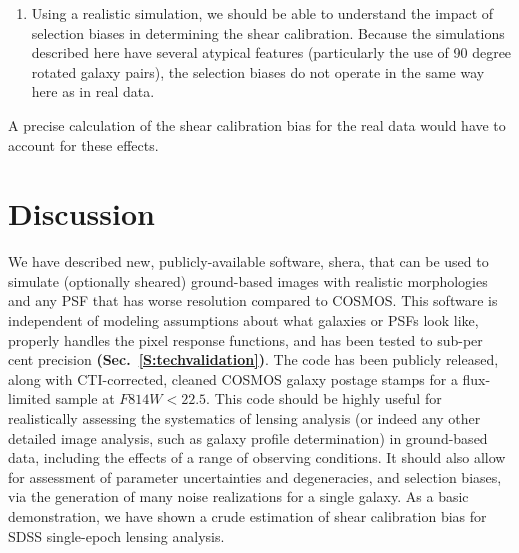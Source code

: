 \documentclass[twocolumn,useAMS,usenatbib]{mn2e}
\newcommand{\newtext}{}
\newcommand{\reftext}[1]{\textbf{#1}}
\begin{document}
\begin{enumerate}
\item Using a realistic simulation, we should be able to understand
  the impact of selection biases in determining the shear
  calibration. \newtext{Because the simulations described here have
    several atypical features (particularly the use of 90 degree
    rotated galaxy pairs), the selection biases do not operate in the
    same way here as in real data.}
\end{enumerate}

A precise calculation of the shear calibration bias for the real
data would have to account for these effects.

%
%
%

\section{Discussion}\label{S:discussion}

We have described new, publicly-available software, {\sc shera}, that can be used to
simulate (optionally sheared) ground-based images with realistic
morphologies and any PSF that has worse resolution compared to COSMOS.
This software is independent of modeling assumptions about what galaxies
or PSFs look like, properly handles the pixel response functions, and
has been tested to sub-per cent precision \reftext{(Sec.~\ref{S:techvalidation})}.  The code has been publicly
released, along with CTI-corrected, cleaned COSMOS galaxy postage
stamps for a flux-limited sample at $F814W<22.5$.  This code should be
highly useful for realistically assessing the systematics of lensing
analysis (or indeed any other detailed image analysis, such as galaxy 
profile determination) in ground-based data, including the effects of
a range of observing conditions.  It should also allow for assessment
of parameter uncertainties and degeneracies, and selection biases, via
the generation of many noise realizations for a single galaxy.  As a
basic demonstration, we have shown a crude estimation of shear
calibration bias for SDSS single-epoch lensing analysis.
\end{document}
